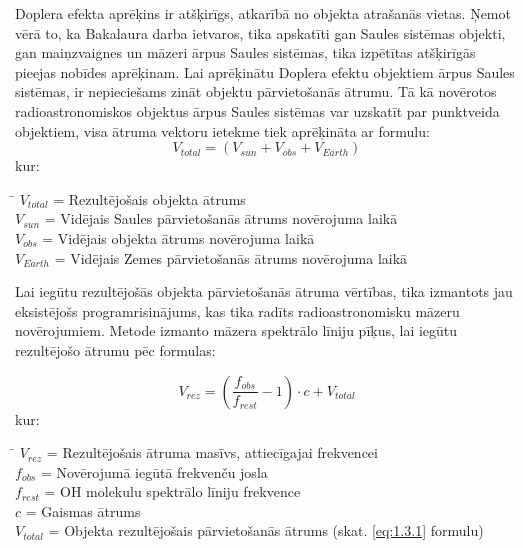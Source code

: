 Doplera efekta aprēķins ir atšķirīgs, atkarībā no objekta atrašanās vietas. Ņemot vērā to, ka Bakalaura darba ietvaros, tika apskatīti gan Saules sistēmas objekti, gan maiņzvaignes un māzeri ārpus Saules sistēmas, tika izpētītas atšķirīgās pieejas nobīdes aprēķinam. Lai aprēķinātu Doplera efektu objektiem ārpus Saules sistēmas, ir nepieciešams zināt objektu pārvietošanās ātrumu. Tā kā novērotos radioastronomiskos objektus ārpus Saules sistēmas var uzskatīt par punktveida objektiem, visa ātruma vektoru ietekme tiek aprēķināta ar formulu:
\begin{equation}
V_{total} = (V_{sun} + V_{obs} + V_{Earth}) \tag{1.3.1}\label{eq:1.3.1} 
\end{equation}
kur: 
\begin{tabbing}
\phantom{\hspace{10mm}}\= \kill
$V_{total}$\> = Rezultējošais objekta ātrums \\
$V_{sun}$\>   = Vidējais Saules pārvietošanās ātrums novērojuma laikā\\
$V_{obs}$\>   = Vidējais objekta ātrums novērojuma laikā\\
$V_{Earth}$\> = Vidējais Zemes pārvietošanās ātrums novērojuma laikā\\


\end{tabbing}



Lai iegūtu rezultējošās objekta pārvietošanās ātruma vērtības, tika izmantots jau eksistējošs programrisinājums, kas tika radīts radioastronomisku māzeru novērojumiem.\cite{vlsr} %
Metode izmanto māzera spektrālo līniju pīķus, lai iegūtu rezultējošo ātrumu pēc formulas:


\begin{equation}
V_{rez}=\left(\frac{f_{obs}}{f_{rest}}-1 \right) \cdot c + V_{total} \tag{1.3.2}\label{eq:1.3.2} 
\end{equation}
kur: 
\begin{tabbing}
\phantom{\hspace{10mm}}\= \kill
$V_{rez}$\> = Rezultējošais ātruma masīvs, attiecīgajai frekvencei \\
$f_{obs}$\>   = Novērojumā iegūtā frekvenču josla\\
$f_{rest}$\>   = OH molekulu spektrālo līniju frekvence \\
$c$\> = Gaismas ātrums\\
$V_{total}$\> = Objekta rezultējošais pārvietošanās ātrums (skat. \eqref{eq:1.3.1} formulu) \\\\

\end{tabbing}

